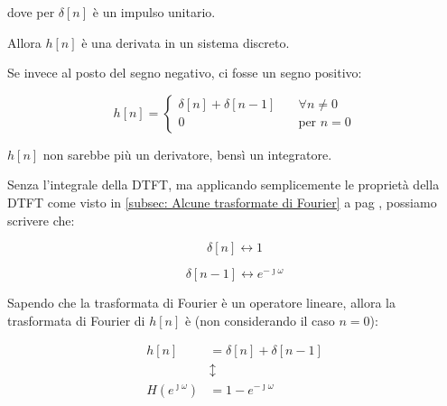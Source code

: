 dove per $\delta \left[ n\right]$ è un impulso unitario. \newline 

Allora $h \left[ n\right]$ è una derivata in un sistema discreto. \newline 

\begin{tcolorbox}
    Se invece al posto del segno negativo, ci fosse un segno positivo: 

 {
    \Large 
    \begin{equation}
        h \left[ n\right]
        = 
        \begin{cases}
        \delta \left[ n\right] 
        +
        \delta \left[ n - 1\right] \quad &\forall n \neq 0 
        \\
        0 \quad &\text{per } n = 0       
        \end{cases}
    \end{equation}
}

$h \left[ n\right]$ non sarebbe più un derivatore, bensì un integratore.
\end{tcolorbox}



Senza l'integrale della DTFT, ma applicando semplicemente le proprietà della DTFT come visto in \ref{subsec: Alcune trasformate di Fourier}  a pag \pageref{subsec: Alcune trasformate di Fourier}, 
possiamo scrivere che: 

{
    \Large 
    \begin{equation}
        \delta \left[ n\right] \leftrightarrow 1 
    \end{equation}
}

{
    \Large 
    \begin{equation}
        \delta \left[ n -1\right] 
        \leftrightarrow 
        e^{- \jmath \omega}
    \end{equation}
}

Sapendo che la trasformata di Fourier è un operatore lineare, 
allora la trasformata di Fourier di $h \left[ n\right]$ è (non considerando il caso $n = 0$): 

{
    \Large 
    \begin{equation}
        \begin{split}
        h \left[ n\right]
        &= 
        \delta \left[ n\right] 
        +
        \delta \left[ n - 1\right] 
        \\
        &\updownarrow
        \\ 
        H \left( e^{\jmath \omega}\right)
        &= 
        1 - e^{- \jmath \omega}
        \end{split}
    \end{equation}
}

